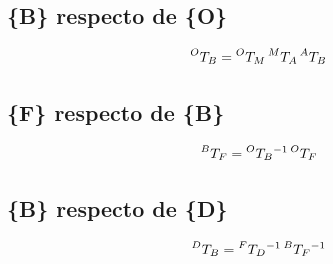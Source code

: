 \documentclass[a4paper,12pt]{article}
\begin{document}
\subsection{\{B\} respecto de \{O\}}
\[\prescript{O}{}{T_B} = \prescript{O}{}{T_M} \prescript{M}{}{T_A} \prescript{A}{}{T_B}\]

\subsection{\{F\} respecto de \{B\}}
\[\prescript{B}{}{T_F} = \prescript{O}{}{T_B}^{-1} \prescript{O}{}{T_F}\]

\subsection{\{B\} respecto de \{D\}}
\[\prescript{D}{}{T_B} = \prescript{F}{}{T_D}^{-1} \prescript{B}{}{T_F}^{-1} \]
\end{document}
